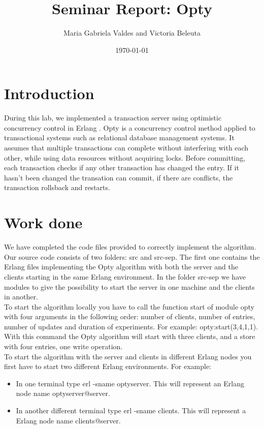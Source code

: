 \documentclass[a4paper, 11pt]{article}
\title{Seminar Report: Opty}
\author{Maria Gabriela Valdes and Victoria Beleuta}
\date{\today{}}
\begin{document}
\maketitle

\section{Introduction}

During this lab, we implemented a transaction server using optimistic concurrency control in Erlang . Opty is a concurrency control method applied to transactional systems such as relational database management systems. It assumes that multiple transactions can complete without interfering with each other, while using data resources without acquiring locks. Before committing, each transaction checks if any other transaction has changed the entry. If it hasn't been changed the transation can commit, if there are conflicts, the transaction rollsback and restarts.
 
\section{Work done}

We have completed the code files provided to correctly implement the algorithm. Our source code consists of two folders: src and src-sep. The first one contains the Erlang files implementing the Opty algorithm with both the server and the clients starting in the same Erlang environment. In the folder src-sep we have modules to give the possibility to start the server in one machine and the clients in another.\\
To start the algorithm locally you have to call the function start of module opty with four arguments in the following order: number of clients, number of entries, number of updates and duration of experiments. For example: opty:start(3,4,1,1). With this command the Opty algorithm will start with three clients, and a store with four entries, one write operation. \\
To start the algorithm with the server and clients in different Erlang nodes you first have to start two different Erlang environments. For example:
\begin{itemize}
\item In one terminal type erl -sname optyserver. This will represent an Erlang node name optyserver@server.\\
\item In another different terminal type erl -sname clients. This will represent a Erlang node name clients@server.\\
\end{itemize}
\end{document}
